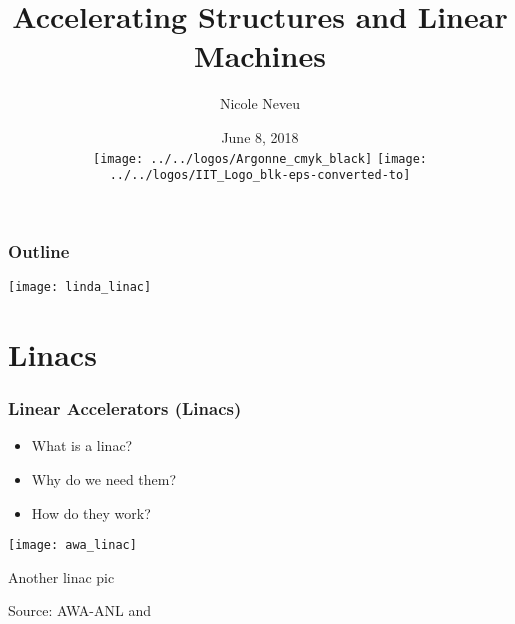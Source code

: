 \documentclass[professionalfonts,t]{beamer}
\title[USPAS 2018]{Accelerating Structures and Linear Machines}
\author[N.Neveu]{{\Large Nicole Neveu}}
\institute[ANL, IIT] %
{   Illinois Institute of Technology \\
	Argonne National Laboratory \\
    \url{nneveu@anl.gov} 
}
\date{ June 8, 2018 \\ \vspace{0.5em}
\texttt{[image: ../../logos/Argonne\_cmyk\_black]}%
\hfill \hfill \hfill%
\texttt{[image: ../../logos/IIT\_Logo\_blk-eps-converted-to]}%
}
\begin{document}
\begin{frame}
  \titlepage
\end{frame}
\begin{frame}
	\frametitle{Outline}
	\begin{minipage}{0.4\textwidth}
		\tableofcontents
	\end{minipage}
\begin{minipage}{0.5\textwidth}
	\centering
	\texttt{[image: linda\_linac]}
\end{minipage}
\end{frame}







\section{Linacs}

\begin{frame}
	\frametitle{Linear Accelerators (Linacs)}
	\vspace{1em}
	
	\begin{minipage}{0.5\textwidth}
		\begin{itemize}
			\item What is a linac?
			\item Why do we need them?
			\item How do they work?
		\end{itemize}
	\end{minipage}
\begin{minipage}{0.45\textwidth}
	\texttt{[image: awa\_linac]}
\end{minipage}

\vspace{1em}
Another linac pic

\vspace{1em}
\hfill Source: AWA-ANL and 
\end{frame}
\end{document}
